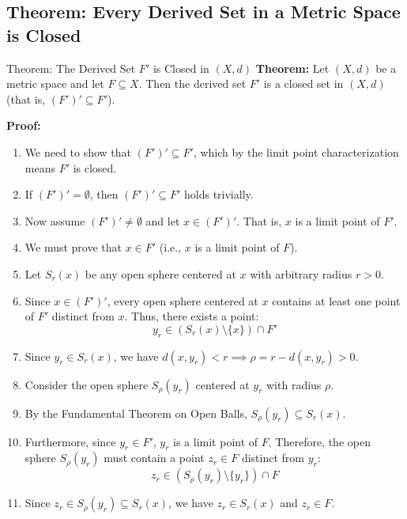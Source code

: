 \documentclass[11pt,a4paper]{article}
\begin{document}
\newpage

\subsection{Theorem: Every Derived Set in a Metric Space is Closed}

\begin{exbox}{Theorem: The Derived Set $F'$ is Closed in $(X, d)$}
\textbf{Theorem:} Let $(X, d)$ be a metric space and let $F \subseteq X$. Then the derived set $F'$ is a closed set in $(X, d)$ (that is, $(F')' \subseteq F'$).

\textbf{Proof:}
\begin{enumerate}
    \item We need to show that $(F')' \subseteq F'$, which by the limit point characterization means $F'$ is closed.
    \item If $(F')' = \emptyset$, then $(F')' \subseteq F'$ holds trivially.
    \item Now assume $(F')' \neq \emptyset$ and let $x \in (F')'$. That is, $x$ is a limit point of $F'$.
    \item We must prove that $x \in F'$ (i.e., $x$ is a limit point of $F$).
    \item Let $S_r(x)$ be any open sphere centered at $x$ with arbitrary radius $r > 0$.
    \item Since $x \in (F')'$, every open sphere centered at $x$ contains at least one point of $F'$ distinct from $x$. Thus, there exists a point:
    \begin{equation}
        y_r \in (S_r(x) \setminus \{x\}) \cap F'
    \end{equation}
    \item Since $y_r \in S_r(x)$, we have $d(x, y_r) < r \implies \rho = r - d(x, y_r) > 0$.
    \item Consider the open sphere $S_\rho(y_r)$ centered at $y_r$ with radius $\rho$.
    \item By the Fundamental Theorem on Open Balls, $S_\rho(y_r) \subseteq S_r(x)$.
    \item Furthermore, since $y_r \in F'$, $y_r$ is a limit point of $F$. Therefore, the open sphere $S_\rho(y_r)$ must contain a point $z_r \in F$ distinct from $y_r$:
    \begin{equation}
        z_r \in (S_\rho(y_r) \setminus \{y_r\}) \cap F
    \end{equation}
    \item Since $z_r \in S_\rho(y_r) \subseteq S_r(x)$, we have $z_r \in S_r(x)$ and $z_r \in F$.

\end{enumerate}
\end{exbox}
\end{document}
